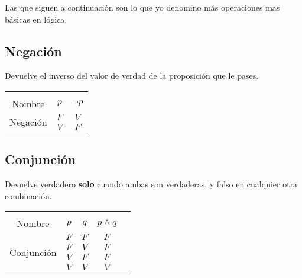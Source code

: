 \documentclass[12pt]{report}                                    %
\begin{document}
\begin{longtable}{p{35mm} || p{30mm} || p{80mm}}
        \end{longtable}

        \clearpage

        Las que siguen a continuación son lo que yo denomino más operaciones mas básicas en lógica.

        \subsection{Negación}

            Devuelve el inverso del valor de verdad de la proposición que le pases.\\

            \begin{tabular}{ |c|c|c| } 
                \hline &&\\
                \large{Nombre} & $p$ & $\lnot p$ \\[0.5em]
                \hline
                \multirow{2}{5em}{Negación}
                & $F$ & $V$  \\ \cline{2-3}
                & $V$ & $F$  \\ \cline{2-3}
                \hline
            \end{tabular}

        \subsection{Conjunción}

            Devuelve verdadero \textbf{solo} cuando ambas son verdaderas, y falso en cualquier
            otra combinación.\\

            \begin{tabular}{ |c|c|c|c|c| } 
                \hline &&&\\
                \large{Nombre} & $p$ & $q$ & $p \land q$ \\[0.5em]
                \hline
                \multirow{4}{5em}{Conjunción}
                & $F$ & $F$ & $F$ \\ \cline{2-4}
                & $F$ & $V$ & $F$ \\ \cline{2-4}
                & $V$ & $F$ & $F$ \\ \cline{2-4}
                & $V$ & $V$ & $V$ \\ 
                \hline
            \end{tabular}
\end{document}
